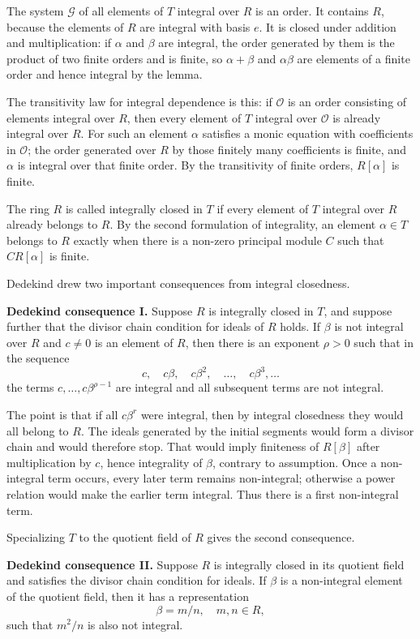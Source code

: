 \documentclass[11pt]{article}
\begin{document}
The system $\mathcal G$ of all elements of $T$ integral over $R$ is an order. It contains $R$, because the elements of $R$ are integral with basis $e$. It is closed under addition and multiplication: if $\alpha$ and $\beta$ are integral, the order generated by them is the product of two finite orders and is finite, so $\alpha+\beta$ and $\alpha\beta$ are elements of a finite order and hence integral by the lemma.

The transitivity law for integral dependence is this: if $\mathcal O$ is an order consisting of elements integral over $R$, then every element of $T$ integral over $\mathcal O$ is already integral over $R$. For such an element $\alpha$ satisfies a monic equation with coefficients in $\mathcal O$; the order generated over $R$ by those finitely many coefficients is finite, and $\alpha$ is integral over that finite order. By the transitivity of finite orders, $R[\alpha]$ is finite.

The ring $R$ is called integrally closed in $T$ if every element of $T$ integral over $R$ already belongs to $R$. By the second formulation of integrality, an element $\alpha\in T$ belongs to $R$ exactly when there is a non-zero principal module $C$ such that $C R[\alpha]$ is finite.

Dedekind drew two important consequences from integral closedness.

\textbf{Dedekind consequence I.} Suppose $R$ is integrally closed in $T$, and suppose further that the divisor chain condition for ideals of $R$ holds. If $\beta$ is not integral over $R$ and $c\neq0$ is an element of $R$, then there is an exponent $\rho>0$ such that in the sequence
\[
  c,
  \quad c\beta,
  \quad c\beta^2,
  \quad \ldots,
  \quad c\beta^3,\ldots
\]
the terms $c,\ldots,c\beta^{\rho-1}$ are integral and all subsequent terms are not integral.

The point is that if all $c\beta^r$ were integral, then by integral closedness they would all belong to $R$. The ideals generated by the initial segments would form a divisor chain and would therefore stop. That would imply finiteness of $R[\beta]$ after multiplication by $c$, hence integrality of $\beta$, contrary to assumption. Once a non-integral term occurs, every later term remains non-integral; otherwise a power relation would make the earlier term integral. Thus there is a first non-integral term.

Specializing $T$ to the quotient field of $R$ gives the second consequence.

\textbf{Dedekind consequence II.} Suppose $R$ is integrally closed in its quotient field and satisfies the divisor chain condition for ideals. If $\beta$ is a non-integral element of the quotient field, then it has a representation
\[
  \beta=m/n,
  \quad m,n\in R,
\]
such that $m^2/n$ is also not integral.
\end{document}

